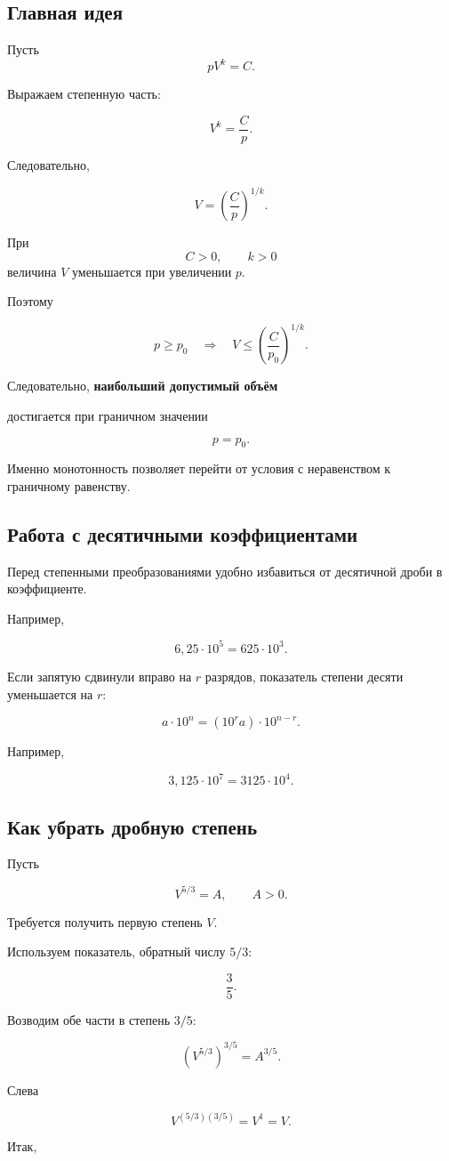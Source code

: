 \documentclass[a4paper,12pt]{article}
\newcommand{\subsect}[1]{%
  \subsection*{\color{accent}#1}%
}
\newcommand{\key}[1]{%
  \textbf{\color{darkaccent}#1}%
}
\begin{document}
\subsect{Главная идея}

Пусть
\[
pV^k=C.
\]

Выражаем степенную часть:

\[
V^k=\frac{C}{p}.
\]

Следовательно,

\[
V=
\left(
\frac{C}{p}
\right)^{1/k}.
\]

При
\[
C>0,
\qquad
k>0
\]
величина $V$ уменьшается при увеличении $p$.

Поэтому

\[
p\ge p_0
\quad\Longrightarrow\quad
V\le
\left(
\frac{C}{p_0}
\right)^{1/k}.
\]

Следовательно, \key{наибольший допустимый объём}
достигается при граничном значении

\[
p=p_0.
\]

Именно монотонность позволяет перейти от условия с неравенством
к граничному равенству.


\subsect{Работа с десятичными коэффициентами}

Перед степенными преобразованиями удобно избавиться от
десятичной дроби в коэффициенте.

Например,

\[
6{,}25\cdot10^5
=
625\cdot10^3.
\]

Если запятую сдвинули вправо на $r$ разрядов,
показатель степени десяти уменьшается на $r$:

\[
a\cdot10^n
=
(10^ra)\cdot10^{n-r}.
\]

Например,

\[
3{,}125\cdot10^7
=
3125\cdot10^4.
\]


\subsect{Как убрать дробную степень}

Пусть

\[
V^{5/3}=A,
\qquad
A>0.
\]

Требуется получить первую степень $V$.

Используем показатель, обратный числу $5/3$:

\[
\frac{3}{5}.
\]

Возводим обе части в степень $3/5$:

\[
\left(
V^{5/3}
\right)^{3/5}
=
A^{3/5}.
\]

Слева

\[
V^{(5/3)(3/5)}
=
V^1
=
V.
\]

Итак,
\end{document}
